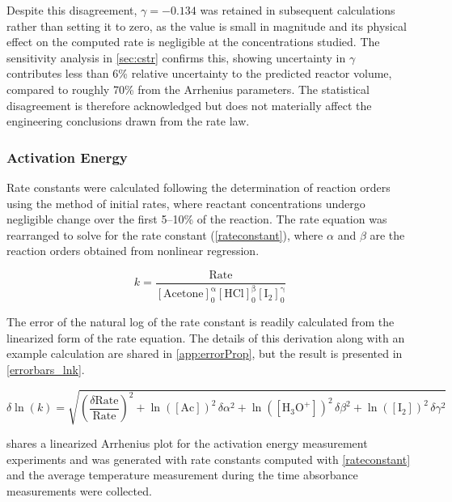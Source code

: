 \documentclass{article}
\begin{document}
Despite this  disagreement, $\gamma = -0.134$ was retained in subsequent calculations rather than setting it to zero, as the value is small in magnitude and its physical effect on the computed rate is negligible at the concentrations studied. The sensitivity analysis in \cref{sec:cstr} confirms this, showing  uncertainty in $\gamma$ contributes less than 6\% relative uncertainty to the predicted reactor volume, compared to roughly 70\% from the Arrhenius parameters. The statistical disagreement is therefore acknowledged but does not materially affect the engineering conclusions drawn from the rate law.


\subsubsection{Activation Energy}
\label{sec:EA}

Rate constants were calculated following the determination of reaction orders using the method of initial rates, where reactant concentrations undergo negligible change over the first 5–10\% of the reaction. The rate equation was rearranged to solve for the rate constant (\cref{rateconstant}), where $\alpha$ and $\beta$ are the reaction orders obtained from nonlinear regression.

\begin{equation}
    k = \frac{\mathrm{Rate}}{\mathrm{[Acetone]_0^\alpha [HCl]_0^\beta [I_2]_0^\gamma}} \label{rateconstant}
\end{equation}

The error of the natural log of the rate constant is readily calculated from the linearized form of the rate equation. The details of this derivation along with an example calculation are shared in \cref{app:errorProp}, but the result is presented in \cref{errorbars_lnk}.


\begin{equation}
\delta \ln(k) = \sqrt{
    \left(\frac{\delta \mathrm{Rate}}{\mathrm{Rate}}\right)^2
    + \ln([\mathrm{Ac}])^2 \, \delta\alpha^2
    + \ln([\mathrm{H_3O^+}])^2 \, \delta\beta^2
    + \ln([\mathrm{I_2}])^2 \, \delta\gamma^2}
\label{errorbars_lnk}
\end{equation}

 shares a linearized Arrhenius plot for the activation energy measurement experiments and was generated with rate constants computed with \cref{rateconstant} and the average temperature measurement during the time absorbance measurements were collected.
\end{document}
